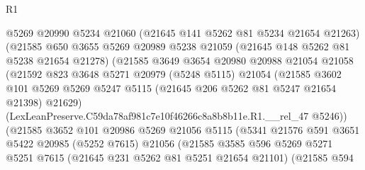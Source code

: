 \begin{lexlean}{R1}
\begin{coremodule}
                          @5269
                          @20990
                          @5234
                          @21060
                          (@21645 @141 @5262 @81 @5234 @21654 @21263)
                          (@21585
                            @650
                            @3655
                            @5269
                            @20989
                            @5238
                            @21059
                            (@21645 @148 @5262 @81 @5238 @21654 @21278)
                            (@21585
                              @3649
                              @3654
                              @20980
                              @20988
                              @21054
                              @21058
                              (@21592
                                @823
                                @3648
                                @5271
                                @20979
                                (@5248 @5115)
                                @21054
                                (@21585
                                  @3602
                                  @101
                                  @5269
                                  @5269
                                  @5247
                                  @5115
                                  (@21645 @206 @5262 @81 @5247 @21654 @21398)
                                  @21629)
                                (LexLeanPreserve.C59da78af981c7e10f46266c8a8b8b11e.R1.__rel_47
                                  @5246))
                              (@21585
                                @3652
                                @101
                                @20986
                                @5269
                                @21056
                                @5115
                                (@5341
                                  @21576
                                  @591
                                  @3651
                                  @5422
                                  @20985
                                  (@5252 @7615)
                                  @21056
                                  (@21585
                                    @3585
                                    @596
                                    @5269
                                    @5271
                                    @5251
                                    @7615
                                    (@21645 @231 @5262 @81 @5251 @21654 @21101)
                                    (@21585
                                      @594

\end{coremodule}
\end{lexlean}
